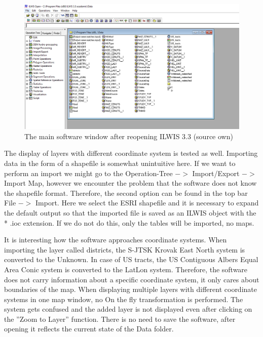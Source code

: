 \documentclass[a4paper,10pt,twoside]{article}
\begin{document}
\vspace{0.3cm}
\begin{figure}[hbt!] 
\begin{center}
\includegraphics[width=17cm]{../pictures/ilwis_uvodni_okno.png} 
\caption[The main software window after reopening ILWIS 3.3 (source own)]{The main software window after reopening ILWIS 3.3 (source own)}
\label{fig:ilwis_uvodni_okno}
\end{center}
\end{figure}

\noindent The display of layers with different coordinate system is tested as well. Importing data in the form of a shapefile is somewhat unintuitive here. If we want to perform an import we might go to the Operation-Tree $->$ Import/Export $->$ Import Map, however we encounter the problem that the software does not know the shapefile format. Therefore, the second option can be found in the top bar File $->$ Import. Here we select the ESRI shapefile and it is necessary to expand the default output so that the imported file is saved as an ILWIS object with the * .ioc extension. If we do not do this, only the tables will be imported, no maps.

It is interesting how the software approaches coordinate systems. When importing the layer called districts, the S-JTSK Krovak East North system is converted to the Unknown. In case of US tracts, the US Contiguous Albers Equal Area Conic system is converted to the LatLon system. Therefore, the software does not carry information about a specific coordinate system, it only cares about boundaries of the map. When displaying multiple layers with different coordinate systems in one map window, no On the fly transformation is performed. The system gets confused and the added layer is not displayed even after clicking on the ''Zoom to Layer'' function. There is no need to save the software, after opening it reflects the current state of the Data folder.
\end{document}
